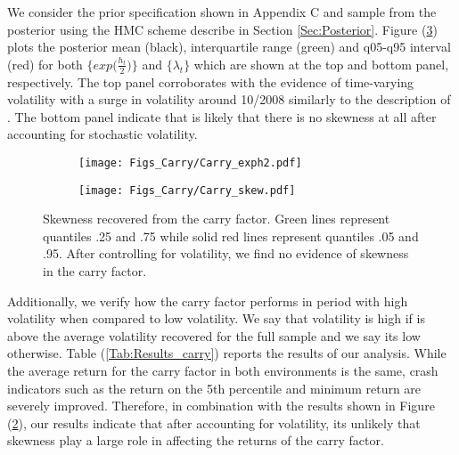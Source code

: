 \documentclass{article}
\begin{document}
We consider the prior specification shown in Appendix C and sample from the posterior using the HMC scheme describe in Section \ref{Sec:Posterior}. Figure (\ref{Fig:Carryexph2_skew}) plots the posterior mean (black), interquartile range (green) and q05-q95 interval (red) for both $\{ exp \Big( \frac{h_t}{2} \Big)\}$ and $\{ \lambda_t \}$ which are shown at the top and bottom panel, respectively. The top panel corroborates with the evidence of time-varying volatility with a surge in volatility around 10/2008 similarly to the description of \cite{jurek2014crash}. The bottom panel indicate that is likely that there is no skewness at all after accounting for stochastic volatility. 

\begin{figure}
\centering
\begin{subfigure}[b]{0.95\textwidth}
\texttt{[image: Figs\_Carry/Carry\_exph2.pdf]} 
   \caption{}
   \label{fig:carry_exph2} 
\end{subfigure}

\begin{subfigure}[b]{0.95\textwidth}
\texttt{[image: Figs\_Carry/Carry\_skew.pdf]} 
   \caption{}
   \label{fig:carry_skew}
\end{subfigure}
\caption{Skewness recovered from the carry factor. Green lines represent quantiles .25 and .75 while solid red lines represent quantiles .05 and .95. After controlling for volatility, we find no evidence of skewness in the carry factor.} 
\label{Fig:Carryexph2_skew}
\end{figure}

Additionally, we verify how the carry factor performs in period with high volatility when compared to low volatility. We say that volatility is high if is above the average volatility recovered for the full sample and we say its low otherwise. Table (\ref{Tab:Results_carry}) reports the results of our analysis. While the average return for the carry factor in both environments is the same, crash indicators such as the return on the 5th percentile and minimum return are severely improved. Therefore, in combination with the results shown in Figure (\ref{fig:carry_skew}), our results indicate that after accounting for volatility, its unlikely that skewness play a large role in affecting the returns of the carry factor.
\end{document}
